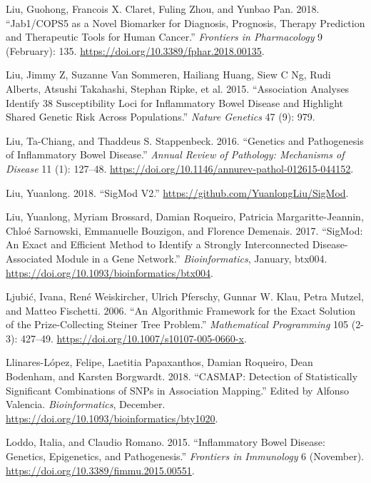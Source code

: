 \documentclass[
  11pt,
]{env/yjiao}
\newlength{\cslhangindent}
\newenvironment{cslreferences}%
  {\setlength{\parindent}{0pt}%
  \everypar{\setlength{\hangindent}{\cslhangindent}}\ignorespaces}%
  {\par}
\begin{document}
\begin{cslreferences}
\leavevmode\hypertarget{ref-liu_jab1_cops5_2018}{}%
Liu, Guohong, Francois X. Claret, Fuling Zhou, and Yunbao Pan. 2018. ``Jab1/COPS5 as a Novel Biomarker for Diagnosis, Prognosis, Therapy Prediction and Therapeutic Tools for Human Cancer.'' \emph{Frontiers in Pharmacology} 9 (February): 135. \url{https://doi.org/10.3389/fphar.2018.00135}.

\leavevmode\hypertarget{ref-liu2015association}{}%
Liu, Jimmy Z, Suzanne Van Sommeren, Hailiang Huang, Siew C Ng, Rudi Alberts, Atsushi Takahashi, Stephan Ripke, et al. 2015. ``Association Analyses Identify 38 Susceptibility Loci for Inflammatory Bowel Disease and Highlight Shared Genetic Risk Across Populations.'' \emph{Nature Genetics} 47 (9): 979.

\leavevmode\hypertarget{ref-liu_genetics_2016}{}%
Liu, Ta-Chiang, and Thaddeus S. Stappenbeck. 2016. ``Genetics and Pathogenesis of Inflammatory Bowel Disease.'' \emph{Annual Review of Pathology: Mechanisms of Disease} 11 (1): 127--48. \url{https://doi.org/10.1146/annurev-pathol-012615-044152}.

\leavevmode\hypertarget{ref-sigmod}{}%
Liu, Yuanlong. 2018. ``SigMod V2.'' \url{https://github.com/YuanlongLiu/SigMod}.

\leavevmode\hypertarget{ref-liu_sigmod:_2017}{}%
Liu, Yuanlong, Myriam Brossard, Damian Roqueiro, Patricia Margaritte-Jeannin, Chloé Sarnowski, Emmanuelle Bouzigon, and Florence Demenais. 2017. ``SigMod: An Exact and Efficient Method to Identify a Strongly Interconnected Disease-Associated Module in a Gene Network.'' \emph{Bioinformatics}, January, btx004. \url{https://doi.org/10.1093/bioinformatics/btx004}.

\leavevmode\hypertarget{ref-ljubic_algorithmic_2006}{}%
Ljubić, Ivana, René Weiskircher, Ulrich Pferschy, Gunnar W. Klau, Petra Mutzel, and Matteo Fischetti. 2006. ``An Algorithmic Framework for the Exact Solution of the Prize-Collecting Steiner Tree Problem.'' \emph{Mathematical Programming} 105 (2-3): 427--49. \url{https://doi.org/10.1007/s10107-005-0660-x}.

\leavevmode\hypertarget{ref-llinares-lopez_casmap_2018}{}%
Llinares-López, Felipe, Laetitia Papaxanthos, Damian Roqueiro, Dean Bodenham, and Karsten Borgwardt. 2018. ``CASMAP: Detection of Statistically Significant Combinations of SNPs in Association Mapping.'' Edited by Alfonso Valencia. \emph{Bioinformatics}, December. \url{https://doi.org/10.1093/bioinformatics/bty1020}.

\leavevmode\hypertarget{ref-loddo_inflammatory_2015}{}%
Loddo, Italia, and Claudio Romano. 2015. ``Inflammatory Bowel Disease: Genetics, Epigenetics, and Pathogenesis.'' \emph{Frontiers in Immunology} 6 (November). \url{https://doi.org/10.3389/fimmu.2015.00551}.


\end{cslreferences}
\end{document}
